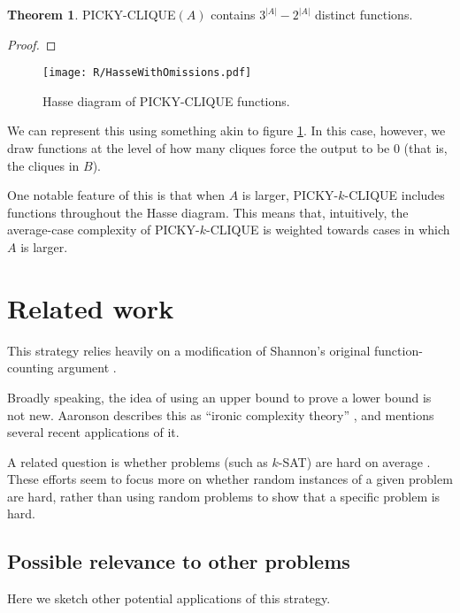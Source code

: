 \documentclass[12pt]{article}
\theoremstyle{definition}
\newtheorem{thm}{Theorem}[section]
\begin{document}
\begin{thm}
\label{pickyDistinct}
PICKY-CLIQUE$(A)$ contains $3^{|A|} - 2^{|A|}$ distinct functions.
\end{thm}
\begin{proof}




\end{proof}



\begin{figure}
\centering
\texttt{[image: R/HasseWithOmissions.pdf]}
\caption{Hasse diagram of PICKY-CLIQUE functions. 
}
\label{fig:Hasse}
\end{figure}


We can represent this using something akin
to figure \ref{fig:Hasse}. In this case, however, we
draw functions at the level of how many
cliques force the output to be 0 (that is,
the cliques in $B$).

One notable feature of this is that when $A$ is
larger, PICKY-$k$-CLIQUE includes functions
throughout the Hasse diagram. This means that,
intuitively, the average-case complexity of
PICKY-$k$-CLIQUE is weighted towards cases
in which $A$ is larger.




\section{Related work}

This strategy relies heavily on a modification of Shannon's original
function-counting argument \cite{shannon_synthesis_1949}.

Broadly speaking, the idea of using an upper bound to prove a lower bound
is not new. Aaronson describes this as ``ironic complexity theory''
\cite{aaronson_pnp}, and mentions several recent applications of it.

A related question is whether problems
(such as $k$-SAT) are
hard on average \cite{bogdanov2006average}.
These efforts seem to focus more on whether
random
instances of a given problem are hard, rather
than using random problems to show that
a specific problem is hard.

\subsection{Possible relevance to other problems}

Here we sketch other potential applications of this strategy.
\end{document}
